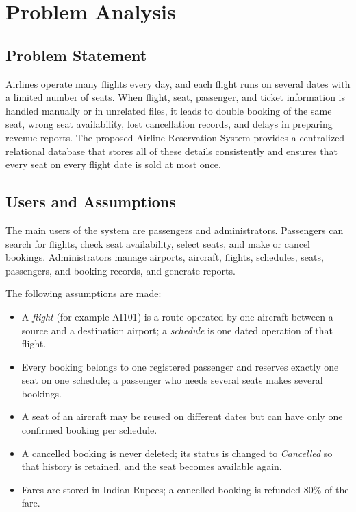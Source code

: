 \documentclass[12pt,a4paper]{article}
\begin{document}
\section{Problem Analysis}
\subsection{Problem Statement}
Airlines operate many flights every day, and each flight runs on several dates with a limited number of
seats. When flight, seat, passenger, and ticket information is handled manually or in unrelated files, it
leads to double booking of the same seat, wrong seat availability, lost cancellation records, and delays
in preparing revenue reports. The proposed Airline Reservation System provides a centralized relational
database that stores all of these details consistently and ensures that every seat on every flight date is
sold at most once.

\subsection{Users and Assumptions}
The main users of the system are passengers and administrators. Passengers can search for flights, check
seat availability, select seats, and make or cancel bookings. Administrators manage airports, aircraft,
flights, schedules, seats, passengers, and booking records, and generate reports.

The following assumptions are made:
\begin{itemize}[nosep]
  \item A \emph{flight} (for example AI101) is a route operated by one aircraft between a source and a
        destination airport; a \emph{schedule} is one dated operation of that flight.
  \item Every booking belongs to one registered passenger and reserves exactly one seat on one schedule;
        a passenger who needs several seats makes several bookings.
  \item A seat of an aircraft may be reused on different dates but can have only one confirmed booking per
        schedule.
  \item A cancelled booking is never deleted; its status is changed to \emph{Cancelled} so that history is
        retained, and the seat becomes available again.
  \item Fares are stored in Indian Rupees; a cancelled booking is refunded 80\% of the fare.
\end{itemize}
\end{document}
